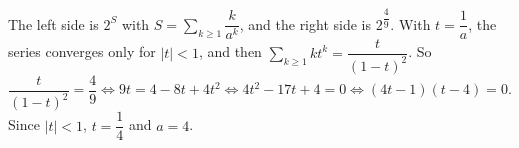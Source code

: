 The left side is $2^{S}$ with $S=\sum_{k\ge1}\dfrac{k}{a^k}$, and the right side is $2^{\dfrac{4}{9}}$. With $t=\dfrac{1}{a}$, the series converges only for $|t|<1$, and then $\sum_{k\ge1}kt^k=\dfrac{t}{(1-t)^2}$. So
\[
\dfrac{t}{(1-t)^2}=\dfrac{4}{9}\iff 9t=4-8t+4t^2\iff 4t^2-17t+4=0\iff (4t-1)(t-4)=0 .
\]
Since $|t|<1$, $t=\dfrac{1}{4}$ and $a=\boxed{4}$.
